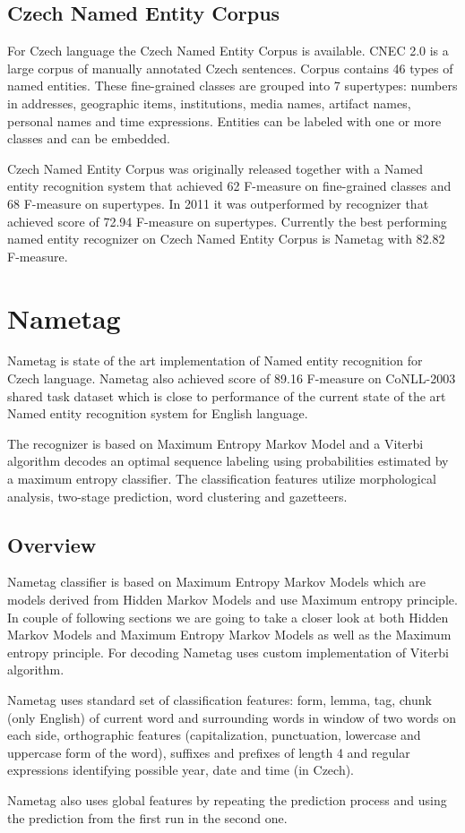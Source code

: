 \documentclass[thesis=B,english]{FITthesis}[2012/10/20]
\begin{document}
\subsection{Czech Named Entity Corpus} \label{cnec}
For Czech language the Czech Named Entity Corpus is available. CNEC 2.0 is a large corpus of manually annotated Czech sentences. Corpus contains 46 types of named entities. These fine-grained classes are grouped into 7 supertypes: numbers in addresses, geographic items, institutions, media names, artifact names, personal names and time expressions. Entities can be labeled with one or more classes and can be embedded. \cite{cnec}  
\par Czech Named Entity Corpus was originally released together with a Named entity recognition system that achieved 62 F-measure on fine-grained classes and 68 F-measure on supertypes. In 2011 it was outperformed by recognizer that achieved score of 72.94 F-measure on supertypes. \cite{previousCzechNER} Currently the best performing named entity recognizer on Czech Named Entity Corpus is Nametag with 82.82 F-measure. \cite{stateOfTheArtCzechNER}


\section{Nametag}
Nametag is state of the art implementation of Named entity recognition for Czech language. Nametag also achieved score of 89.16 F-measure on CoNLL-2003 shared task dataset which is close to performance of the current state of the art Named entity recognition system for English language. 
\par The recognizer is based on Maximum Entropy Markov Model and a Viterbi \cite{forney1973viterbi} algorithm decodes an optimal sequence labeling using probabilities estimated by a maximum entropy classifier. The classification features utilize morphological analysis, two-stage prediction, word clustering and gazetteers. \cite{stateOfTheArtCzechNER}  

\subsection{Overview}
\par Nametag classifier is based on Maximum Entropy Markov Models which are models derived from Hidden Markov Models and use Maximum entropy principle. In couple of following sections we are going to take a closer look at both Hidden Markov Models and Maximum Entropy Markov Models as well as the Maximum entropy principle.
For decoding Nametag uses custom implementation of Viterbi algorithm. \cite{forney1973viterbi}
\par Nametag uses standard set of classification features: form, lemma, tag, chunk (only English) of current word and surrounding words in window of two words on each side, orthographic features (capitalization, punctuation, lowercase and uppercase form of the word), suffixes and prefixes of length 4 and regular expressions identifying possible year, date and time (in Czech). \cite{stateOfTheArtCzechNER} 
\par Nametag also uses global features by repeating the prediction process and using the prediction from the first run in the second one.
\end{document}

